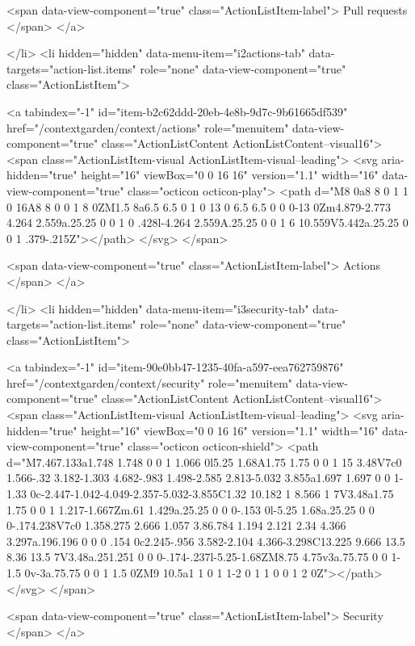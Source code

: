         <span data-view-component="true" class="ActionListItem-label">
          Pull requests
</span>      
</a>
  
</li>
        <li hidden="hidden" data-menu-item="i2actions-tab" data-targets="action-list.items" role="none" data-view-component="true" class="ActionListItem">
    
    
    <a tabindex="-1" id="item-b2c62ddd-20eb-4e8b-9d7c-9b61665df539" href="/contextgarden/context/actions" role="menuitem" data-view-component="true" class="ActionListContent ActionListContent--visual16">
        <span class="ActionListItem-visual ActionListItem-visual--leading">
          <svg aria-hidden="true" height="16" viewBox="0 0 16 16" version="1.1" width="16" data-view-component="true" class="octicon octicon-play">
    <path d="M8 0a8 8 0 1 1 0 16A8 8 0 0 1 8 0ZM1.5 8a6.5 6.5 0 1 0 13 0 6.5 6.5 0 0 0-13 0Zm4.879-2.773 4.264 2.559a.25.25 0 0 1 0 .428l-4.264 2.559A.25.25 0 0 1 6 10.559V5.442a.25.25 0 0 1 .379-.215Z"></path>
</svg>
        </span>
      
        <span data-view-component="true" class="ActionListItem-label">
          Actions
</span>      
</a>
  
</li>
        <li hidden="hidden" data-menu-item="i3security-tab" data-targets="action-list.items" role="none" data-view-component="true" class="ActionListItem">
    
    
    <a tabindex="-1" id="item-90e0bb47-1235-40fa-a597-eea762759876" href="/contextgarden/context/security" role="menuitem" data-view-component="true" class="ActionListContent ActionListContent--visual16">
        <span class="ActionListItem-visual ActionListItem-visual--leading">
          <svg aria-hidden="true" height="16" viewBox="0 0 16 16" version="1.1" width="16" data-view-component="true" class="octicon octicon-shield">
    <path d="M7.467.133a1.748 1.748 0 0 1 1.066 0l5.25 1.68A1.75 1.75 0 0 1 15 3.48V7c0 1.566-.32 3.182-1.303 4.682-.983 1.498-2.585 2.813-5.032 3.855a1.697 1.697 0 0 1-1.33 0c-2.447-1.042-4.049-2.357-5.032-3.855C1.32 10.182 1 8.566 1 7V3.48a1.75 1.75 0 0 1 1.217-1.667Zm.61 1.429a.25.25 0 0 0-.153 0l-5.25 1.68a.25.25 0 0 0-.174.238V7c0 1.358.275 2.666 1.057 3.86.784 1.194 2.121 2.34 4.366 3.297a.196.196 0 0 0 .154 0c2.245-.956 3.582-2.104 4.366-3.298C13.225 9.666 13.5 8.36 13.5 7V3.48a.251.251 0 0 0-.174-.237l-5.25-1.68ZM8.75 4.75v3a.75.75 0 0 1-1.5 0v-3a.75.75 0 0 1 1.5 0ZM9 10.5a1 1 0 1 1-2 0 1 1 0 0 1 2 0Z"></path>
</svg>
        </span>
      
        <span data-view-component="true" class="ActionListItem-label">
          Security
</span>      
</a>
  
